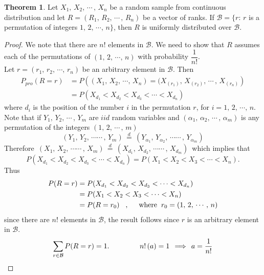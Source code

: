 \documentclass[12pt,a4paper]{report}
\theoremstyle{definition}
\newtheorem{thm}{Theorem}[section]
\theoremstyle{plain}
\begin{document}
\begin{thm}
Let $X_1, \, X_2, \, \cdots\, , \, X_n$ be a random sample from continuous distribution and let $R = (R_1, \, R_2, \, \cdots\, , \, R_n)$  be a vector of ranks. If $\mathcal{B} = \{r:\, r$ is a permutation of integers $1,\, 2, \, \cdots,\, n\}$, then $R$ is uniformly distributed over $\mathcal{B}$.
\end{thm}

\begin{proof}
We note that there are $n!$ elements in $\mathcal{B}$. We need to show that $R$ assumes each of the permutations of $(1,\, 2,\, \cdots,\, n)$ with probability $\dfrac{1}{n!}$.\\

Let $r = (r_1, \, r_2, \, \cdots, \, r_n)$ be an arbitrary element in $\mathcal{B}$. Then
\begin{align*}
P_{pro}(R = r) & = P\left((X_1,\, X_2,\, \cdots,\, X_n) = (X_{(r_1)}, \, X_{(r_2)},\, \cdots\,,\,X_{(r_n)}\right)\\
&  = P(X_{d_1} < X_{d_2} < X_{d_3} < \cdots < X_{d_n})
\end{align*} 
where $d_i$ is the position of the number $i$ in the  permutation $r$, for $i = 1, \, 2, \, \cdots, \, n$.\\
Note that if $Y_1, \, Y_2,\, \cdots\, ,\, Y_m$ are $iid$ random variables and  $(\alpha_1, \, \alpha_2, \, \cdots\,, \, \alpha_m)$ is any permutation of the integers $(1, \, 2,\, \cdots\, , \, m)$
$$\left(Y_1, \, Y_2, \, \cdots\cdots\, , \, Y_m\right)\, \overset{d}{=}\, \left(Y_{\alpha_1}, \, Y_{\alpha_2}, \, \cdots\cdots\, , \, Y_{\alpha_m}\right)$$
Therefore $\,\left(X_1, \, X_2, \, \cdots\cdots\, , \, X_m\right)\, \overset{d}{=}\, \left(X_{d_1}, \, X_{d_2}, \, \cdots\cdots\, , \, X_{d_m}\right)\,$ which implies that $$P(X_{d_1} < X_{d_2} < X_{d_3} < \cdots < X_{d_n}) = P(X_1 < X_2 < X_3 < \cdots < X_n).$$
Thus
\begin{align*}
P(R = r) & = P(X_{d_1} < X_{d_2} < X_{d_3} < \cdots < X_{d_n})\\
 & = P(X_1 < X_2 < X_3 < \cdots < X_n)\\
& = P(R = r_0)\hspace{0.3cm}, \hspace{0.5cm}\text{where}\hspace{0.2cm} r_0 = (1, \, 2,\, \cdots\, , \, n)
\end{align*}
since there are $n!$ elements in $\mathcal{B}$, the result follows since $r$ is an arbitrary element in $\mathcal{B}$.
$$\sum_{r\in\mathcal{B}} P(R = r) = 1.\hspace{1.5cm} n!\, (a) = 1 \, \implies \, a = \frac{1}{n!}$$
\end{proof}
\end{document}
